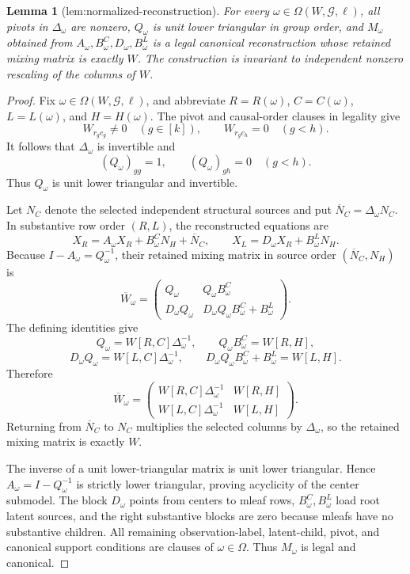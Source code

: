 \documentclass{article}
\newtheorem{lemma}{Lemma}
\begin{document}
\begin{lemma}[lem:normalized-reconstruction]\label{lem:normalized-reconstruction}
For every \(\omega\in\Omega(W,\mathcal G,\ell)\), all pivots in \(\Delta_{\omega}\) are nonzero, \(Q_{\omega}\) is unit lower triangular in group order, and \(M_{\omega}\) obtained from \(A_{\omega},B^{C}_{\omega},D_{\omega},B^{L}_{\omega}\) is a legal canonical reconstruction whose retained mixing matrix is exactly \(W\). The construction is invariant to independent nonzero rescaling of the columns of \(W\).
\end{lemma}
\begin{proof}
Fix \(\omega\in\Omega(W,\mathcal G,\ell)\), and abbreviate \(R=R(\omega)\), \(C=C(\omega)\), \(L=L(\omega)\), and \(H=H(\omega)\). The pivot and causal-order clauses in legality give
\[
W_{r_gc_g}\ne0\quad(g\in[k]),\qquad W_{r_gc_h}=0\quad(g<h).
\]
It follows that \(\Delta_\omega\) is invertible and
\[
(Q_\omega)_{gg}=1,\qquad (Q_\omega)_{gh}=0\quad(g<h).
\]
Thus \(Q_\omega\) is unit lower triangular and invertible.

Let \(N_C\) denote the selected independent structural sources and put \(\overline N_C=\Delta_\omega N_C\). In substantive row order \((R,L)\), the reconstructed equations are
\[
X_R=A_\omega X_R+B^C_\omega N_H+\overline N_C,
\qquad X_L=D_\omega X_R+B^L_\omega N_H.
\]
Because \(I-A_\omega=Q_\omega^{-1}\), their retained mixing matrix in source order \((\overline N_C,N_H)\) is
\[
\overline W_\omega=
\begin{pmatrix}
Q_\omega&Q_\omega B^C_\omega\\
D_\omega Q_\omega&D_\omega Q_\omega B^C_\omega+B^L_\omega
\end{pmatrix}.
\]
The defining identities give
\[
Q_\omega=W[R,C]\Delta_\omega^{-1},\qquad Q_\omega B^C_\omega=W[R,H],
\]
\[
D_\omega Q_\omega=W[L,C]\Delta_\omega^{-1},\qquad
D_\omega Q_\omega B^C_\omega+B^L_\omega=W[L,H].
\]
Therefore
\[
\overline W_\omega=
\begin{pmatrix}
W[R,C]\Delta_\omega^{-1}&W[R,H]\\
W[L,C]\Delta_\omega^{-1}&W[L,H]
\end{pmatrix}.
\]
Returning from \(\overline N_C\) to \(N_C\) multiplies the selected columns by \(\Delta_\omega\), so the retained mixing matrix is exactly \(W\).

The inverse of a unit lower-triangular matrix is unit lower triangular. Hence \(A_\omega=I-Q_\omega^{-1}\) is strictly lower triangular, proving acyclicity of the center submodel. The block \(D_\omega\) points from centers to mleaf rows, \(B^C_\omega,B^L_\omega\) load root latent sources, and the right substantive blocks are zero because mleafs have no substantive children. All remaining observation-label, latent-child, pivot, and canonical support conditions are clauses of \(\omega\in\Omega\). Thus \(M_\omega\) is legal and canonical.


\end{proof}
\end{document}
